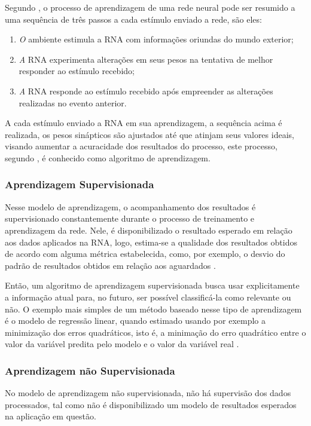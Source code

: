Segundo , o processo de aprendizagem de uma rede neural pode ser resumido a uma sequência de três passos a cada estímulo enviado a rede, são eles:

\begin{enumerate}
	\item \textit O ambiente estimula a RNA com informações oriundas do mundo exterior;
	\item \textit A RNA experimenta alterações em seus pesos na tentativa de melhor responder ao estímulo recebido;
	\item \textit A RNA responde ao estímulo recebido após empreender as alterações realizadas no evento anterior.
\end{enumerate}

A cada estímulo enviado a RNA em sua aprendizagem, a sequência acima é realizada, os pesos sinápticos são ajustados até que atinjam seus valores ideais, visando aumentar a acuracidade dos resultados do processo, este processo, segundo , é conhecido como algoritmo de aprendizagem.

\subsubsection{Aprendizagem Supervisionada}
Nesse modelo de aprendizagem, o acompanhamento dos resultados é supervisionado constantemente durante o processo de treinamento e aprendizagem da rede. Nele, é disponibilizado o resultado esperado em relação aos dados aplicados na RNA, logo, estima-se a qualidade dos resultados obtidos de acordo com alguma métrica estabelecida, como, por exemplo, o desvio do padrão de resultados obtidos em relação aos aguardados \cite{haykin2009}.

Então, um algoritmo de aprendizagem supervisionada busca usar explicitamente a informação atual para, no futuro,  ser possível classificá-la como relevante ou não. O exemplo mais simples de um método baseado nesse tipo de aprendizagem é o modelo de regressão linear, quando estimado usando por exemplo a minimização dos erros quadráticos, isto é, a minimação do erro quadrático entre o valor da variável predita pelo modelo e o valor da variável real \cite{elpink}.

\subsubsection{Aprendizagem não Supervisionada}
No modelo de aprendizagem não supervisionada, não há supervisão dos dados processados, tal como não é disponibilizado um modelo de resultados esperados na aplicação em questão.

